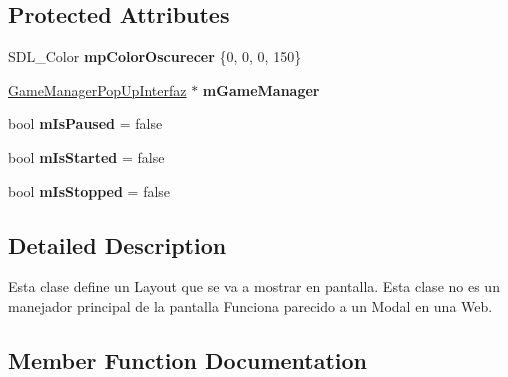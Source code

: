 \subsection*{Protected Attributes}
\begin{DoxyCompactItemize}
\item 
S\+D\+L\+\_\+\+Color {\bfseries mp\+Color\+Oscurecer} \{0, 0, 0, 150\}\hypertarget{class_pop_up_interfaz_a8c2800bae691a19d2213ee77e721bc74}{}\label{class_pop_up_interfaz_a8c2800bae691a19d2213ee77e721bc74}

\item 
\hyperlink{class_game_manager_pop_up_interfaz}{Game\+Manager\+Pop\+Up\+Interfaz} $\ast$ {\bfseries m\+Game\+Manager}\hypertarget{class_pop_up_interfaz_aaad46ade411c4a53a03051e49bf85980}{}\label{class_pop_up_interfaz_aaad46ade411c4a53a03051e49bf85980}

\item 
bool {\bfseries m\+Is\+Paused} = false\hypertarget{class_pop_up_interfaz_a009eb3ad4abb23e43030100a1cddc7db}{}\label{class_pop_up_interfaz_a009eb3ad4abb23e43030100a1cddc7db}

\item 
bool {\bfseries m\+Is\+Started} = false\hypertarget{class_pop_up_interfaz_a349b279b49b191fa9860cd162b92f9a9}{}\label{class_pop_up_interfaz_a349b279b49b191fa9860cd162b92f9a9}

\item 
bool {\bfseries m\+Is\+Stopped} = false\hypertarget{class_pop_up_interfaz_af9a3b3f2ec61749c715bdcd3896785dc}{}\label{class_pop_up_interfaz_af9a3b3f2ec61749c715bdcd3896785dc}

\end{DoxyCompactItemize}


\subsection{Detailed Description}
Esta clase define un Layout que se va a mostrar en pantalla. Esta clase no es un manejador principal de la pantalla Funciona parecido a un Modal en una Web. 

\subsection{Member Function Documentation}
